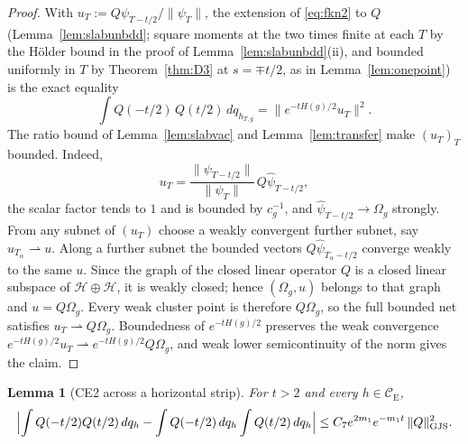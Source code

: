 \documentclass[11pt,a4paper]{article}
\theoremstyle{plain}
\newtheorem{lemma}[theorem]{Lemma}
\theoremstyle{definition}
\theoremstyle{plain}
\theoremstyle{definition}
\newcommand{\CE}{\mathcal{C}_{\mathrm E}}
\newcommand{\HH}{\mathcal{H}}
\newcommand{\Om}{\Omega}
\begin{document}
\begin{proof}
With $u_T:=Q\psi_{T-t/2}/\|\psi_T\|$, the extension of \eqref{eq:fkn2} to $Q$
(Lemma~\ref{lem:slabunbdd}; square moments at the two times finite at each $T$ by the
H\"older bound in the proof of Lemma~\ref{lem:slabunbdd}(ii), and bounded uniformly in $T$
by Theorem~\ref{thm:D3} at $s=\mp t/2$, as in Lemma~\ref{lem:onepoint}) is the
exact equality
\[
 \int Q(-t/2)\,Q(t/2)\,dq_{h_{T,g}}=\bigl\|e^{-tH(g)/2}u_T\bigr\|^2 .
\]
The ratio bound of Lemma~\ref{lem:slabvac} and Lemma~\ref{lem:transfer} make $(u_T)_T$
bounded.  Indeed,
\[
 u_T=\frac{\|\psi_{T-t/2}\|}{\|\psi_T\|}\,
       Q\widehat\psi_{T-t/2},
\]
the scalar factor tends to $1$ and is bounded by $c_g^{-1}$, and
$\widehat\psi_{T-t/2}\to\Om_g$ strongly.  From any subnet of $(u_T)$ choose a
weakly convergent further subnet, say $u_{T_\alpha}\rightharpoonup u$.  Along a
further subnet the bounded vectors $Q\widehat\psi_{T_\alpha-t/2}$ converge weakly
to the same $u$.  Since the graph of the closed linear operator $Q$ is a closed
linear subspace of $\HH\oplus\HH$, it is weakly closed; hence
$(\Om_g,u)$ belongs to that graph and $u=Q\Om_g$.  Every weak cluster point is
therefore $Q\Om_g$, so the full bounded net satisfies
$u_T\rightharpoonup Q\Om_g$. Boundedness of $e^{-tH(g)/2}$ preserves the weak convergence
$e^{-tH(g)/2}u_T\rightharpoonup e^{-tH(g)/2}Q\Om_g$, and weak lower semicontinuity of the
norm gives the claim.
\end{proof}

\begin{lemma}[CE2 across a horizontal strip]\label{lem:ce2strip}
For $t>2$ and every $h\in\CE$,
\[
 \Bigl|\int Q(-t/2)Q(t/2)\,dq_h
 -\int Q(-t/2)\,dq_h\int Q(t/2)\,dq_h\Bigr|
 \le C_7e^{2m_1}e^{-m_1t}\,\|Q\|_{\rm GJS}^2 .
\]
\end{lemma}
\end{document}
